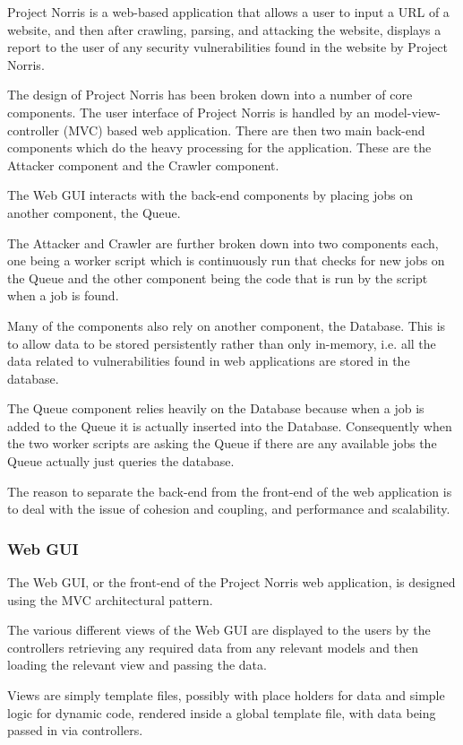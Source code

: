 \documentclass[12pt,a4paper]{article}
\begin{document}
Project Norris is a web-based application that allows a user to input a URL of a website, and then after crawling, parsing, and attacking the website, displays a report to the user of any security vulnerabilities found in the website by Project Norris.

The design of Project Norris has been broken down into a number of core components.  The user interface of Project Norris is handled by an model-view-controller (MVC) based web application.  There are then two main back-end components which do the heavy processing for the application.  These are the Attacker component and the Crawler component.

The Web GUI interacts with the back-end components by placing jobs on another component, the Queue.

The Attacker and Crawler are further broken down into two components each, one being a worker script which is continuously run that checks for new jobs on the Queue and the other component being the code that is run by the script when a job is found.

Many of the components also rely on another component, the Database. This is to allow data to be stored persistently rather than only in-memory, i.e. all the data related to vulnerabilities found in web applications are stored in the database.

The Queue component relies heavily on the Database because when a job is added to the Queue it is actually inserted into the Database.  Consequently when the two worker scripts are asking the Queue if there are any available jobs the Queue actually just queries the database.

The reason to separate the back-end from the front-end of the web application is to deal with the issue of cohesion and coupling, and performance and scalability. 

\subsubsection{Web GUI}
The Web GUI, or the front-end of the Project Norris web application, is designed using the MVC architectural pattern.

The various different views of the Web GUI are displayed to the users by the controllers retrieving any required data from any relevant models and then loading the relevant view and passing the data.

Views are simply template files, possibly with place holders for data and simple logic for dynamic code, rendered inside a global template file, with data being passed in via controllers.
\end{document}
